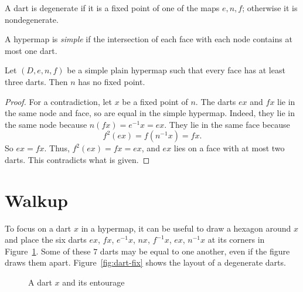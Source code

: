 \begin{definition}[degenerate] A dart is degenerate if it is a
fixed point of one of the maps $e,n,f$; otherwise it is nondegenerate.  
\end{definition}

\begin{definition}[simple] 
A hypermap is {\it simple} if the intersection of each face with each node contains at most one dart.
\end{definition}


\begin{lemma} 
Let $(D,e,n,f)$ be a simple plain hypermap such that every face has
at least three darts.
Then $n$ has no fixed point.
\end{lemma}

\begin{proof}  For a contradiction, let $x$ be a fixed point of $n$. The darts $e x$ and $f x$ lie in the same node and face, so are equal in the simple hypermap.  Indeed, they lie in the same node because $n(f x) = e^{-1} x = e x$. They lie in the same face because     
  $$f^2 (e x) =  f(n^{-1} x) = f x.$$
So $e x = f x$.   Thus, $f^2 (e x) = f x = e x$, and $e x$ lies on a face with at most two darts.  This contradicts what is given.
\end{proof}




\section{Walkup}

To focus on a dart $x$ in a
hypermap, it can be useful to draw a hexagon around $x$ and place
the six darts $e x$,
$f x$, $e^{-1} x$, $n x$,  $f^{-1} x$, $e x$, $n^{-1} x$  at its corners
in Figure~\ref{fig:dart+}.  Some of these $7$ darts may be
equal to one another, even if the figure draws them apart.
Figure~\ref{fig:dart-fix} shows the layout of a degenerate darts.

\begin{figure}[htb]
  \centering
  \caption{A dart $x$ and its entourage}
  \label{fig:dart+}
\end{figure}

